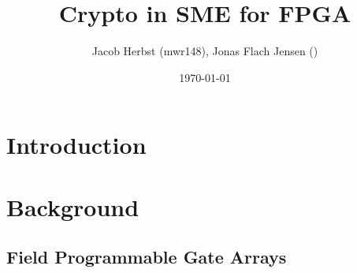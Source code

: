 \documentclass[a4paper]{article}
\author{Jacob Herbst (mwr148), Jonas Flach Jensen ()}
\date{\today}
\title{Crypto in SME for FPGA}
\begin{document}
\maketitle
\tableofcontents

\newpage
\section{Introduction}
\label{sec:org87f5a0a}

\section{Background}
\label{sec:org6fba24d}

\subsection{Field Programmable Gate Arrays}
\label{sec:org3e220b9}
\end{document}
